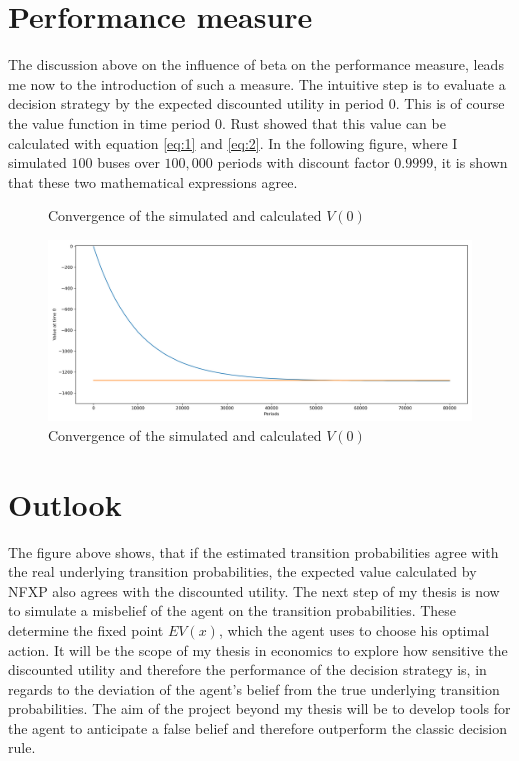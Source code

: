 \documentclass[a4paper,12pt,bold]{scrartcl}
\begin{document}
\section{Performance measure}
The discussion above on the influence of beta on the performance measure, leads me now to the introduction of such a measure. The intuitive step is to evaluate a decision strategy by the expected discounted utility in period $0$. This is of course the value function in time period 0. Rust showed that this value can be calculated with equation \ref{eq:1} and \ref{eq:2}. In the following figure, where I simulated $100$ buses over $100,000$ periods with discount factor $0.9999$, it is shown that these two mathematical expressions agree.
\begin{figure}[h]
\centering
\caption{Convergence of the simulated and calculated $V(0)$}

\includegraphics[width=1\linewidth]{../simulation/figure_1}
\caption{Convergence of the simulated and calculated $V(0)$}
 
\end{figure}

\section{Outlook}
The figure above shows, that if the estimated transition probabilities agree with the real underlying transition probabilities, the expected value calculated by NFXP also agrees with the discounted utility. The next step of my thesis is now to simulate a misbelief of the agent on the transition probabilities. These determine the fixed point $EV(x)$, which the agent uses to choose his optimal action. It will be the scope of my thesis in economics to explore how sensitive the discounted utility and therefore the performance of the decision strategy is, in regards to the deviation of the agent's belief from the true underlying transition probabilities. The aim of the project beyond my thesis will be to develop tools for the agent to anticipate a false belief and therefore outperform the classic decision rule.

\newpage


\end{document}
